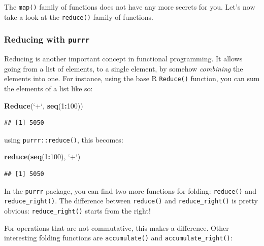 \documentclass[]{gitbook}
\newenvironment{Shaded}{\begin{snugshade}}{\end{snugshade}}
\newcommand{\DataTypeTok}[1]{\textcolor[rgb]{0.13,0.29,0.53}{#1}}
\newcommand{\DecValTok}[1]{\textcolor[rgb]{0.00,0.00,0.81}{#1}}
\newcommand{\KeywordTok}[1]{\textcolor[rgb]{0.13,0.29,0.53}{\textbf{#1}}}
\newcommand{\NormalTok}[1]{#1}
\newcommand{\OperatorTok}[1]{\textcolor[rgb]{0.81,0.36,0.00}{\textbf{#1}}}
\newcommand{\StringTok}[1]{\textcolor[rgb]{0.31,0.60,0.02}{#1}}
\begin{document}
The \texttt{map()} family of functions does not have any more secrets for you. Let's now take a look at
the \texttt{reduce()} family of functions.

\hypertarget{reducing-with-purrr}{%
\subsubsection{\texorpdfstring{Reducing with \texttt{purrr}}{Reducing with purrr}}\label{reducing-with-purrr}}

Reducing is another important concept in functional programming. It allows going from a list of
elements, to a single element, by somehow \emph{combining} the elements into one. For instance, using
the base R \texttt{Reduce()} function, you can sum the elements of a list like so:

\begin{Shaded}
\begin{Highlighting}[]
\KeywordTok{Reduce}\NormalTok{(}\StringTok{`}\DataTypeTok{+}\StringTok{`}\NormalTok{, }\KeywordTok{seq}\NormalTok{(}\DecValTok{1}\OperatorTok{:}\DecValTok{100}\NormalTok{))}
\end{Highlighting}
\end{Shaded}

\begin{verbatim}
## [1] 5050
\end{verbatim}

using \texttt{purrr::reduce()}, this becomes:

\begin{Shaded}
\begin{Highlighting}[]
\KeywordTok{reduce}\NormalTok{(}\KeywordTok{seq}\NormalTok{(}\DecValTok{1}\OperatorTok{:}\DecValTok{100}\NormalTok{), }\StringTok{`}\DataTypeTok{+}\StringTok{`}\NormalTok{)}
\end{Highlighting}
\end{Shaded}

\begin{verbatim}
## [1] 5050
\end{verbatim}

In the \texttt{purrr} package, you can find two more functions for folding: \texttt{reduce()} and
\texttt{reduce\_right()}. The difference between \texttt{reduce()} and \texttt{reduce\_right()} is pretty obvious:
\texttt{reduce\_right()} starts from the right!

For operations that are not commutative, this makes a difference. Other interesting folding
functions are \texttt{accumulate()} and \texttt{accumulate\_right()}:
\end{document}
